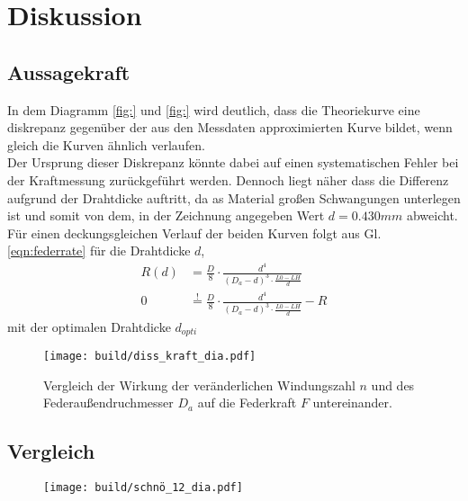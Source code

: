 \newpage
\section{Diskussion}
\subsection{Aussagekraft}
In dem Diagramm \ref{fig:} und \ref{fig:} wird deutlich, dass die
Theoriekurve eine diskrepanz gegenüber der aus den Messdaten approximierten 
Kurve bildet, wenn gleich die Kurven ähnlich verlaufen.\\
Der Ursprung dieser Diskrepanz könnte dabei auf einen systematischen Fehler
bei der Kraftmessung zurückgeführt werden. Dennoch liegt näher dass die Differenz
aufgrund der Drahtdicke auftritt, da as Material großen Schwangungen unterlegen ist 
und somit von dem, in der Zeichnung angegeben Wert $d=0.430\si{mm}$ abweicht.\\
Für einen deckungsgleichen Verlauf der beiden Kurven folgt aus Gl. \ref{eqn:federrate} für die Drahtdicke $d$,
\begin{align*}
    R(d)&=\frac{D}{8} \cdot \frac{d^4}{(D_a-d)^3\cdot \frac{L0-LH}{d}}\\
    0&\overset{\text{!}}{=}\frac{D}{8} \cdot \frac{d^4}{(D_a-d)^3\cdot \frac{L0-LH}{d}}-R
\end{align*}
mit der optimalen Drahtdicke $d_{opti}$ 

\begin{figure}
    \center
    \texttt{[image: build/diss\_kraft\_dia.pdf]}
    \caption{
        Vergleich der Wirkung der veränderlichen Windungszahl $n$ und
        des Federaußendruchmesser $D_a$ auf die Federkraft $F$ untereinander.
    }
\end{figure}

\subsection{Vergleich}

\begin{figure}[H]
    \center
    \texttt{[image: build/schnö\_12\_dia.pdf]}
    \caption{}
\end{figure}

\label{sec:Diskussion}
